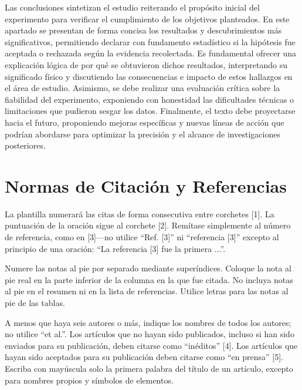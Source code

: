 \documentclass[conference]{IEEEtran}
\begin{document}
Las conclusiones sintetizan el estudio reiterando el propósito inicial del experimento para verificar el cumplimiento de los objetivos planteados. En este apartado se presentan de forma concisa los resultados y descubrimientos más significativos, permitiendo declarar con fundamento estadístico si la hipótesis fue aceptada o rechazada según la evidencia recolectada. Es fundamental ofrecer una explicación lógica de por qué se obtuvieron dichos resultados, interpretando su significado físico y discutiendo las consecuencias e impacto de estos hallazgos en el área de estudio. Asimismo, se debe realizar una evaluación crítica sobre la fiabilidad del experimento, exponiendo con honestidad las dificultades técnicas o limitaciones que pudieron sesgar los datos. Finalmente, el texto debe proyectarse hacia el futuro, proponiendo mejoras específicas y nuevas líneas de acción que podrían abordarse para optimizar la precisión y el alcance de investigaciones posteriores.

\section*{Normas de Citación y Referencias}

La plantilla numerará las citas de forma consecutiva entre corchetes [1]. La puntuación de la oración sigue al corchete [2]. Remítase simplemente al número de referencia, como en [3]—no utilice ``Ref. [3]'' ni ``referencia [3]'' excepto al principio de una oración: ``La referencia [3] fue la primera ...''.

Numere las notas al pie por separado mediante superíndices. Coloque la nota al pie real en la parte inferior de la columna en la que fue citada. No incluya notas al pie en el resumen ni en la lista de referencias. Utilice letras para las notas al pie de las tablas.

A menos que haya seis autores o más, indique los nombres de todos los autores; no utilice ``et al.''. Los artículos que no hayan sido publicados, incluso si han sido enviados para su publicación, deben citarse como ``inéditos'' [4]. Los artículos que hayan sido aceptados para su publicación deben citarse como ``en prensa'' [5]. Escriba con mayúscula solo la primera palabra del título de un artículo, excepto para nombres propios y símbolos de elementos.
\end{document}
